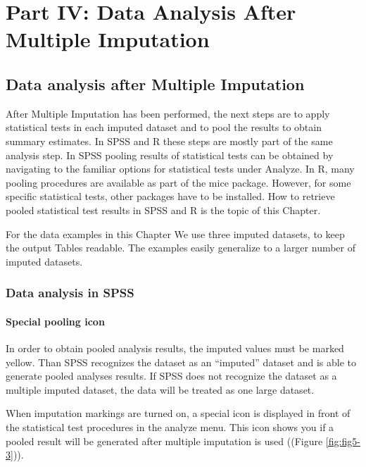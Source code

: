 \documentclass[]{book}
\begin{document}
\part{Part IV: Data Analysis After Multiple
Imputation}\label{part-part-iv-data-analysis-after-multiple-imputation}

\chapter{Data analysis after Multiple
Imputation}\label{data-analysis-after-multiple-imputation}

After Multiple Imputation has been performed, the next steps are to
apply statistical tests in each imputed dataset and to pool the results
to obtain summary estimates. In SPSS and R these steps are mostly part
of the same analysis step. In SPSS pooling results of statistical tests
can be obtained by navigating to the familiar options for statistical
tests under Analyze. In R, many pooling procedures are available as part
of the mice package. However, for some specific statistical tests, other
packages have to be installed. How to retrieve pooled statistical test
results in SPSS and R is the topic of this Chapter.

For the data examples in this Chapter We use three imputed datasets, to
keep the output Tables readable. The examples easily generalize to a
larger number of imputed datasets.

\section{Data analysis in SPSS}\label{data-analysis-in-spss}

\subsection{Special pooling icon}\label{special-pooling-icon}

In order to obtain pooled analysis results, the imputed values must be
marked yellow. Than SPSS recognizes the dataset as an ``imputed''
dataset and is able to generate pooled analyses results. If SPSS does
not recognize the dataset as a multiple imputed dataset, the data will
be treated as one large dataset.

When imputation markings are turned on, a special icon is displayed in
front of the statistical test procedures in the analyze menu. This icon
shows you if a pooled result will be generated after multiple imputation
is used ((Figure \ref{fig:fig5-3})).
\end{document}
